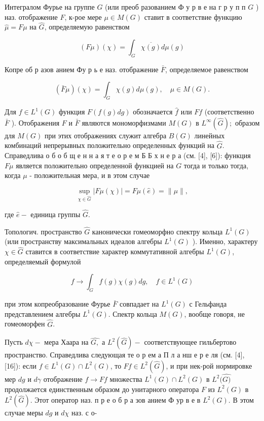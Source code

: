 \documentclass[10pt]{article}
\begin{document}
Интегралом Фурье на группе $G$ (или преоб разованием Ф у р в е на г р у п п $G$ ) наз. отображение $F$, к-рое мере $\mu \in M(G)$ ставит в соответствие функцию $\hat{\mu}=F \mu$ на $\hat{G}$, определяемую равенством



\[

(F \mu)(\chi)=\int_{G} \overline{\chi(g)} d \mu(g)

\]



Копре об р азов анием Фу р ь е наз. отображение $\bar{F}$, определяемое равенством



\[

(\bar{F} \mu)(\chi)=\int_{G} \chi(g) d \mu(g), \quad \mu \in M(G) .

\]



Для $f \in L^{1}(G)$ функция $F(f(g) d g)$ обозначается $\hat{f}$ или $F f$ (соответственно $\bar{F}$ ). Отображения $F$ и $\bar{F}$ являются мономорфизмами $M(G)$ в $L^{\infty}(\widehat{G}) ;$ образом для $M(G)$ при этих отображениях служит алгебра $B(G)$ линейных комбинаций непрерывных положительно определенных функций на $\widehat{G}$. Справедлива о б о б щ е н н а я т е о р е м Б Б х н е р а (см. [4], [6]): функция $F \mu$ является положительно определенной функцией на $G$ тогда и только тогда, когда $\mu$ - положительная мера, и в этом случае



\[

\sup _{\chi \in \widehat{G}}|F \mu(\chi)|=F \mu(\hat{e})=\|\mu\|,

\]



где $\hat{e}-$ единица группы $\hat{G}$.



Топологич. пространство $\widehat{G}$ канонически гомеоморфно спектру кольца $L^{1}(G)$ (или пространству максимальных идеалов алгебры $L^{1}(G)$ ). Именно, характеру $\chi \in \widehat{G}$ ставится в соответствие характер коммутативной алгебры $L^{1}(G)$, определяемый формулой



\[

f \longrightarrow \int_{G} f(g) \chi(g) d g, \quad f \in L^{1}(G)

\]



при этом копреобразование Фурье $\bar{F}$ совпадает на $L^{1}(G)$ с Гельфанда представлением алгебры $L^{1}(G)$. Спектр кольца $M(G)$, вообще говоря, не гомеоморфен $\hat{G}$.



Пусть $d \chi-$ мера Хаара на $\widehat{G,}$ а $L^{2}(\widehat{G})-$ соответствующее гильбертово пространство. Справедлива следующая те о р ем а П л а нш е р е ля (см. [4], [16]): если $f \in L^{1}(G) \cap L^{2}(G)$, то $F f \in L^{2}(\widehat{G})$, и при нек-рой нормировке мер $d g$ и $d \gamma$ отображение $f \rightarrow F f$ множества $L^{1}(G) \cap L^{2}(G)$ в $L^{2}(\widehat{G)}$ продолжается единственным образом до унитарного оператора $F$ из $L^{2}(G)$ в $L^{2}(\hat{G})$. Этот оператор наз. п р е о б р а зов анием Ф ур в е в $L^{2}(G)$. В этом случае меры $d g$ и $d \chi$ наз. с о-
\end{document}
